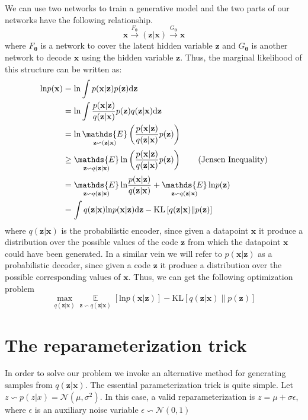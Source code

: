 \documentclass{article}
\begin{document}
	We can use two networks to train a generative model and the two parts of our networks have the following relationship.
	\begin{equation}
	\mathbf{x}\stackrel{F_{\boldsymbol{\theta}}}{\longrightarrow}\mathbf{(z|x)}\stackrel{G_{\boldsymbol{\theta}}}{\longrightarrow}\hat{\mathbf{x}} 
	\end{equation}
	where $F_{\boldsymbol{\theta}}$ is a network to cover the latent hidden variable $\mathbf{z}$ and $G_{\boldsymbol{\theta}}$ is another network to decode $\mathbf{x}$ using the hidden variable $\mathbf{z}$. Thus, the marginal likelihood of this structure can be written as:
	\begin{align}
	\text{ln}p(\mathbf{x}) &= \text{ln}\int p(\mathbf{x}|\mathbf{z})p(\mathbf{z})\text{d}\mathbf{z}\notag\\
	& = \text{ln}\int \frac{p(\mathbf{x}|\mathbf{z})}{q(\mathbf{\mathbf{z}|\mathbf{x}})}p(\mathbf{z})q(\mathbf{z}|\mathbf{x})\text{d}\mathbf{z}\notag\\
	&= \text{ln}\mathop{\mathds{E}}\limits_{\mathbf{z} \backsim (\mathbf{z}|\mathbf{x})}\left(\frac{p(\mathbf{x}|\mathbf{z})}{q(\mathbf{z}|\mathbf{x})}p(\mathbf{z})\right)\notag\\
	&\geq \mathop{\mathds{E}}\limits_{\mathbf{z}\backsim q(\mathbf{z}|\mathbf{x})}\text{ln}\left(\frac{p(\mathbf{x}|\mathbf{z})}{q(\mathbf{z}|\mathbf{x})}p(\mathbf{z})\right)\tag{Jensen Inequality}\\
	&=\mathop{\mathds{E}}\limits_{\mathbf{z}\backsim q (\mathbf{z}|\mathbf{x})}\text{ln}\frac{p(\mathbf{x}|\mathbf{z})}{q(\mathbf{z}|\mathbf{x})}+\mathop{\mathds{E}}\limits_{\mathbf{z}\backsim q (\mathbf{z}|\mathbf{x})}\text{ln}p(\mathbf{z})\notag\\
	&= \int q(\mathbf{z}|\mathbf{x})\text{ln}p(\mathbf{x}|\mathbf{z})\text{d}\mathbf{z}-\text{KL}\left[q(\mathbf{z}|\mathbf{x})\|p(\mathbf{z})\right]
	\end{align}
	where $q(\mathbf{z|x})$ is the probabilistic encoder, since given a datapoint $\mathbf{x}$ it produce a distribution over the possible values of the code $\mathbf{z}$ from which the datapoint $\mathbf{x}$ could have been generated. In a similar vein we will refer to $p(\mathbf{x|z})$ as a probabilistic decoder, since given a code $\mathbf{z}$ it produce a distribution over the possible corresponding values of $\mathbf{x}$. Thus, we can get the following optimization problem
	\begin{equation}
	\mathop{\text{max}}\limits_{q(\mathbf{z|x})}\mathop{\mathds{E}}\limits_{\mathbf{z}\backsim q(\mathbf{z|x})}\left[\text{ln}p(\mathbf{x|z})\right]-\text{KL}\left[q(\mathbf{z|x})\|p(\mathbf{z})\right]
	\end{equation}
	\section{The reparameterization trick}
	In order to solve our problem we invoke an alternative method for generating samples from $q(\mathbf{z|x})$. The essential parameterization trick is quite simple. Let $z\backsim p(z|x)=\mathcal{N}(\mu,\sigma^2)$. In this case, a valid reparameterization is $z = \mu + \sigma\epsilon$, where $\epsilon$ is an auxiliary noise variable $\epsilon \backsim \mathcal{N}(0,1)$
\end{document}
